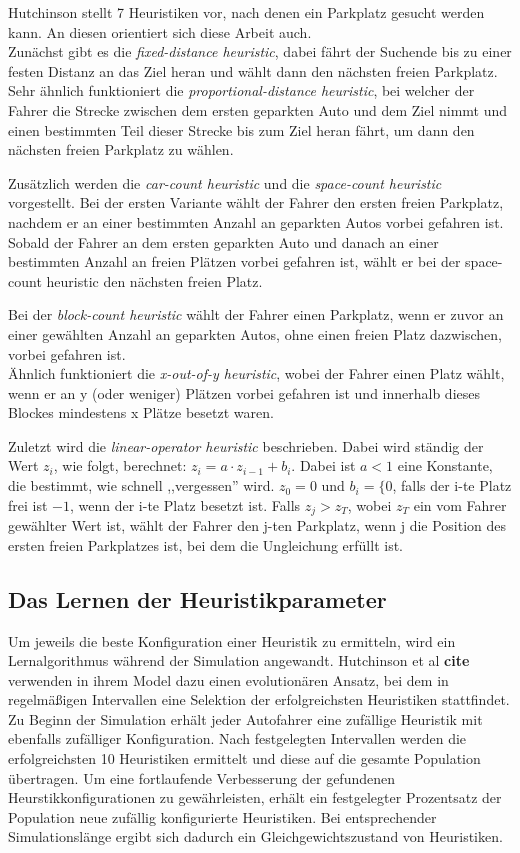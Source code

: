 Hutchinson stellt 7 Heuristiken vor, nach denen ein Parkplatz gesucht werden kann. An diesen orientiert sich diese Arbeit auch. \\
Zunächst gibt es die \emph{fixed-distance heuristic}, dabei fährt der Suchende bis zu einer festen Distanz an das Ziel heran und wählt dann den nächsten freien Parkplatz. Sehr ähnlich funktioniert die \emph{proportional-distance heuristic}, bei welcher der Fahrer die Strecke zwischen dem ersten geparkten Auto und dem Ziel nimmt und einen bestimmten Teil dieser Strecke bis zum Ziel heran fährt, um dann den nächsten freien Parkplatz zu wählen.

Zusätzlich werden die \emph{car-count heuristic} und die \emph{space-count heuristic} vorgestellt. Bei der ersten Variante wählt der Fahrer den ersten freien Parkplatz, nachdem er an einer bestimmten Anzahl an geparkten Autos vorbei gefahren ist. Sobald der Fahrer an dem ersten geparkten Auto und danach an einer bestimmten Anzahl an freien Plätzen vorbei gefahren ist, wählt er bei der space-count heuristic den nächsten freien Platz.

Bei der \emph{block-count heuristic} wählt der Fahrer einen Parkplatz, wenn er zuvor an einer gewählten Anzahl an geparkten Autos, ohne einen freien Platz dazwischen, vorbei gefahren ist.\\
Ähnlich funktioniert die \emph{x-out-of-y heuristic}, wobei der Fahrer einen Platz wählt, wenn er an y (oder weniger) Plätzen vorbei gefahren ist und innerhalb dieses Blockes mindestens x Plätze besetzt waren. 

Zuletzt wird die \emph{linear-operator heuristic} beschrieben. Dabei wird ständig der Wert $z_i$, wie folgt, berechnet: $z_i=a\cdot z_{i-1}+b_i$. Dabei ist $a<1$ eine Konstante, die bestimmt, wie schnell ,,vergessen'' wird. $z_0=0$ und $b_i=\lbrace 0$, falls der i-te Platz frei ist $-1$, wenn der i-te Platz besetzt ist. %
Falls $z_j>z_T$, wobei $z_T$ ein vom Fahrer gewählter Wert ist, wählt der Fahrer den j-ten Parkplatz, wenn j die Position des ersten freien Parkplatzes ist, bei dem die Ungleichung erfüllt ist. 

\subsection{Das Lernen der Heuristikparameter}
Um jeweils die beste Konfiguration einer Heuristik zu ermitteln, wird ein Lernalgorithmus während der Simulation angewandt. Hutchinson et al \textbf{cite} verwenden in ihrem Model dazu einen evolutionären Ansatz, bei dem in regelmäßigen Intervallen eine Selektion der erfolgreichsten Heuristiken stattfindet. Zu Beginn der Simulation erhält jeder Autofahrer eine zufällige Heuristik mit ebenfalls zufälliger Konfiguration. Nach festgelegten Intervallen werden die erfolgreichsten 10 Heuristiken ermittelt und diese auf die gesamte Population übertragen. Um eine fortlaufende Verbesserung der gefundenen Heurstikkonfigurationen zu gewährleisten, erhält ein festgelegter Prozentsatz der Population neue zufällig konfigurierte Heuristiken. Bei entsprechender Simulationslänge ergibt sich dadurch ein Gleichgewichtszustand von Heuristiken. 

